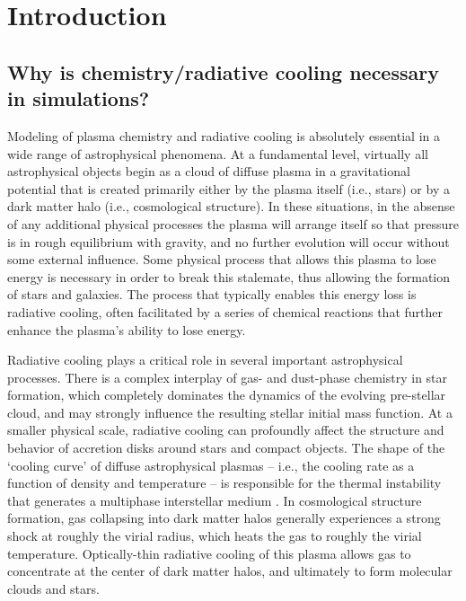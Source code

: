 \section{Introduction} \label{sec:intro}

\subsection{Why is chemistry/radiative cooling necessary in
  simulations?}

Modeling of plasma chemistry and radiative cooling is absolutely
essential in a wide range of astrophysical phenomena.  At a
fundamental level, virtually all astrophysical objects begin as a
cloud of diffuse plasma in a gravitational potential that is created
primarily either by the plasma itself (i.e., stars) or by a dark
matter halo (i.e., cosmological structure).  In these situations, in
the absense of any additional physical processes the plasma will
arrange itself so that pressure is in rough equilibrium with gravity,
and no further evolution will occur without some external influence.
Some physical process that allows this plasma to lose energy is
necessary in order to break this stalemate, thus allowing the
formation of stars and galaxies.  The process that typically enables
this energy loss is radiative cooling, often facilitated by a series
of chemical reactions that further enhance the plasma's ability to
lose energy.

Radiative cooling plays a critical role in several important
astrophysical processes.  There is a complex interplay of gas- and
dust-phase chemistry in star formation, which completely dominates the
dynamics of the evolving pre-stellar cloud, and may strongly influence
the resulting stellar initial mass function.
\citep{2002Sci...295...93A,2011ApJ...726...55T,2008AIPC..990...25G} At
a smaller physical scale, radiative cooling can profoundly affect the
structure and behavior of accretion disks around stars and compact
objects.  \citep{1973A&A....24..337S} The shape of the `cooling curve'
of diffuse astrophysical plasmas -- i.e., the cooling rate as a
function of density and temperature -- is responsible for the thermal
instability that generates a multiphase interstellar medium
\citep{1977ApJ...218..148M,1978ppim.book.....S}.  In cosmological
structure formation, gas collapsing into dark matter halos generally
experiences a strong shock at roughly the virial radius, which heats
the gas to roughly the virial temperature.  Optically-thin radiative
cooling of this plasma allows gas to concentrate at the center of dark
matter halos, and ultimately to form molecular clouds and stars.
\citep{1977MNRAS.179..541R,1991ApJ...379...52W}

